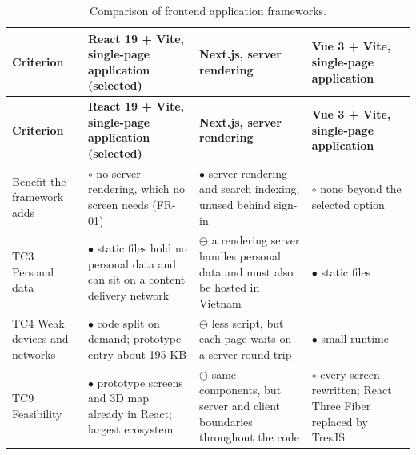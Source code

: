 {\small
\begin{longtable}{|>{\raggedright\arraybackslash}p{}|>{\raggedright\arraybackslash}p{}|>{\raggedright\arraybackslash}p{}|>{\raggedright\arraybackslash}p{}|}
\caption{Comparison of frontend application frameworks.} \\
\hline
\textbf{Criterion} & \textbf{React 19 + Vite, single-page application (selected)} & \textbf{Next.js, server rendering\cite{r169}} & \textbf{Vue 3 + Vite, single-page application\cite{r170}} \\ \hline
\endfirsthead
\hline
\textbf{Criterion} & \textbf{React 19 + Vite, single-page application (selected)} & \textbf{Next.js, server rendering\cite{r169}} & \textbf{Vue 3 + Vite, single-page application\cite{r170}} \\ \hline
\endhead
Benefit the framework adds & $\circ$ no server rendering, which no screen needs (FR-01) & $\bullet$ server rendering and search indexing, unused behind sign-in & $\circ$ none beyond the selected option \\ \hline
TC3 Personal data & $\bullet$ static files hold no personal data and can sit on a content delivery network & $\ominus$ a rendering server handles personal data and must also be hosted in Vietnam & $\bullet$ static files \\ \hline
TC4 Weak devices and networks & $\bullet$ code split on demand; prototype entry about 195 KB & $\ominus$ less script, but each page waits on a server round trip & $\bullet$ small runtime \\ \hline
TC9 Feasibility & $\bullet$ prototype screens and 3D map already in React; largest ecosystem\cite{r134} & $\ominus$ same components, but server and client boundaries throughout the code & $\circ$ every screen rewritten; React Three Fiber replaced by TresJS\cite{r171} \\ \hline
\end{longtable}
}

